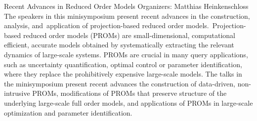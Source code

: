 \label{mini16}

\miniabs
{Recent Advances in Reduced Order Models}
{Organizers: Matthias Heinkenschloss}
{The speakers in this minisymposium present recent advances in the construction, analysis, and application of projection-based reduced order models. Projection-based reduced order models (PROMs) are small-dimensional, computational efficient, accurate models obtained by systematically extracting the relevant dynamics of large-scale systems. PROMs are crucial in many query applications, such as uncertainty quantification, optimal control or parameter identification, where they replace the prohibitively expensive large-scale models. The talks in the minisymposium present recent advances the construction of data-driven, non-intrusive PROMs, modifications of PROMs that preserve structure of the underlying large-scale full order models, and applications of PROMs in large-scale optimization and parameter identification.}

